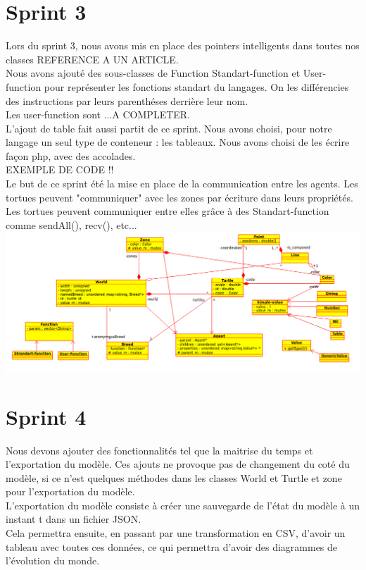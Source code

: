 \section{Sprint 3}

Lors du sprint 3, nous avons mis en place des pointers intelligents dans toutes nos classes REFERENCE A UN ARTICLE.\\
Nous avons ajouté des sous-classes de Function Standart-function et User-function pour représenter les fonctions standart du langages. On les différencies des instructions par leurs parenthéses derrière leur nom.\\ Les user-function sont ...A COMPLETER.\\
L'ajout de table fait aussi partit de ce sprint. Nous avons choisi, pour notre langage un seul type de conteneur : les tableaux.
Nous avons choisi de les écrire façon php, avec des accolades.\\
EXEMPLE DE CODE !!\\
Le but de ce sprint été la mise en place de la communication entre les agents. Les tortues peuvent "communiquer" avec les zones par écriture dans leurs propriétés. Les tortues peuvent communiquer entre elles grâce à des Standart-function comme sendAll(), recv(), etc...\\
\includegraphics[scale=0.4]{doc/report/uml/v03.png}

\section{Sprint 4}
Nous devons ajouter des fonctionnalités tel que la maitrise du temps et l'exportation du modèle. Ces ajouts ne provoque pas de changement du coté du modèle, si ce n'est quelques méthodes dans les classes World et Turtle et zone pour l'exportation du modèle.\\
L'exportation du modèle consiste à créer une sauvegarde de l'état du modèle à un instant t dans un fichier JSON.\\
Cela permettra ensuite, en passant par une transformation en CSV, d'avoir un tableau avec toutes ces données, ce qui permettra d'avoir des diagrammes de l'évolution du monde.\\

